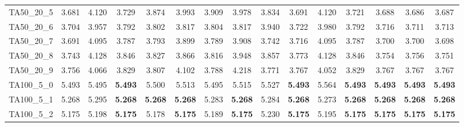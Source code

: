 \begin{tabular}{cc||ccccccccccccc}
TA50\_20\_5        & 3.681            & 4.120            & 3.729            & 3.874            & 3.993            & 3.909            & 3.978            & 3.834            & 3.691            & 4.120            & 3.721            & 3.688            & 3.686            & 3.687           \\ 
TA50\_20\_6        & 3.704            & 3.957            & 3.792            & 3.802            & 3.817            & 3.804            & 3.817            & 3.940            & 3.722            & 3.980            & 3.792            & 3.716            & 3.711            & 3.713           \\ 
TA50\_20\_7        & 3.691            & 4.095            & 3.787            & 3.793            & 3.899            & 3.789            & 3.908            & 3.742            & 3.716            & 4.095            & 3.787            & 3.700            & 3.700            & 3.698           \\ 
TA50\_20\_8        & 3.743            & 4.128            & 3.846            & 3.827            & 3.866            & 3.816            & 3.948            & 3.857            & 3.773            & 4.128            & 3.846            & 3.754            & 3.756            & 3.751           \\ 
TA50\_20\_9        & 3.756            & 4.066            & 3.829            & 3.807            & 4.102            & 3.788            & 4.218            & 3.771            & 3.767            & 4.052            & 3.829            & 3.767            & 3.767            & 3.767           \\ 
TA100\_5\_0        & 5.493            & 5.495            & {\bf 5.493}      & 5.500            & 5.513            & 5.495            & 5.515            & 5.527            & {\bf 5.493}      & 5.564            & {\bf 5.493}      & {\bf 5.493}      & {\bf 5.493}      & {\bf 5.493}     \\ 
TA100\_5\_1        & 5.268            & 5.295            & {\bf 5.268}      & {\bf 5.268}      & {\bf 5.268}      & 5.283            & {\bf 5.268}      & 5.284            & {\bf 5.268}      & 5.273            & {\bf 5.268}      & {\bf 5.268}      & {\bf 5.268}      & {\bf 5.268}     \\ 
TA100\_5\_2        & 5.175            & 5.198            & {\bf 5.175}      & 5.178            & {\bf 5.175}      & 5.189            & {\bf 5.175}      & 5.230            & {\bf 5.175}      & 5.195            & {\bf 5.175}      & {\bf 5.175}      & {\bf 5.175}      & {\bf 5.175}     \\ 

\end{tabular}

